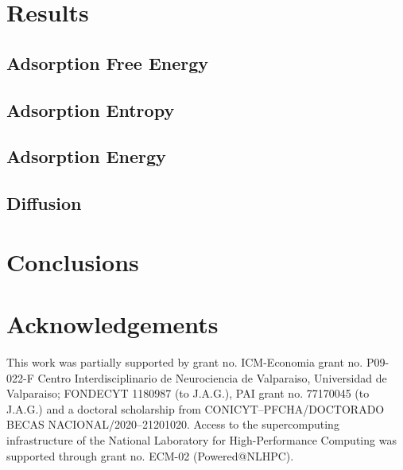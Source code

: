 \documentclass[twoside,twocolumn,9pt]{article}
\begin{document}
\section{Results}

\subsection{Adsorption Free Energy}

\subsection{Adsorption Entropy}

\subsection{Adsorption Energy}

\subsection{Diffusion}

\section{Conclusions}


\section*{Acknowledgements}
This work was partially supported by grant no. ICM-Economia grant
no. P09-022-F Centro Interdisciplinario de Neurociencia de Valparaiso,
Universidad de Valparaiso; FONDECYT 1180987 (to J.A.G.), PAI grant
no. 77170045 (to J.A.G.) and a doctoral scholarship from
CONICYT--PFCHA/DOCTORADO BECAS NACIONAL/2020--21201020.  Access to the
supercomputing infrastructure of the National Laboratory for
High-Performance Computing was supported through grant no. ECM-02
(Powered@NLHPC).




\end{document}
